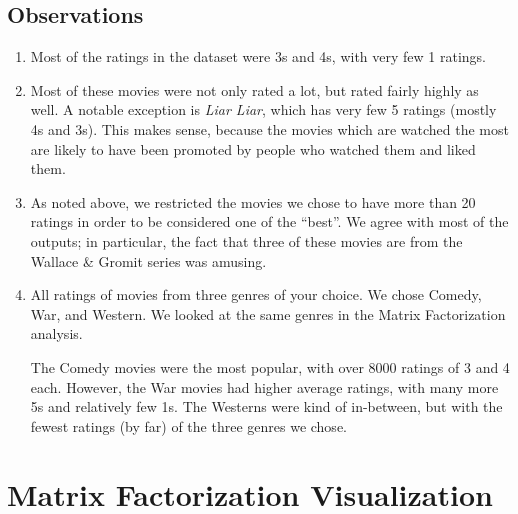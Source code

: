 \subsection{Observations}
\begin{enumerate}
    \item Most of the ratings in the dataset were 3s and 4s, with very few 1 ratings.  
    \item Most of these movies were not only rated a lot, but rated fairly highly as well.  A notable exception is \emph{Liar Liar}, which has very few 5 ratings (mostly 4s and 3s).  This makes sense, because the movies which are watched the most are likely to have been promoted by people who watched them and liked them.
    \newpage
    \item As noted above, we restricted the movies we chose to have more than 20 ratings in order to be considered one of the ``best''.  We agree with most of the outputs; in particular, the fact that three of these movies are from the Wallace \& Gromit series was amusing.
    \item All ratings of movies from three genres of your choice.  We chose Comedy, War, and Western.  We looked at the same genres in the Matrix Factorization analysis.

    The Comedy movies were the most popular, with over 8000 ratings of 3 and 4 each.  However, the War movies had higher average ratings, with many more 5s and relatively few 1s.  The Westerns were kind of in-between, but with the fewest ratings (by far) of the three genres we chose.
\end{enumerate}



\newpage

\section{Matrix Factorization Visualization}

